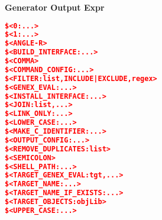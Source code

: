 \documentclass{article}
\begin{document}
\begin{minipage}[t]{0.18\linewidth}
\textbf{Generator Output Expr}
\begin{lstlisting}[language=CMake]
$<0:...>
$<1:...>
$<ANGLE-R>
$<BUILD_INTERFACE:...>
$<COMMA>
$<COMMAND_CONFIG:...>
$<FILTER:list,INCLUDE|EXCLUDE,regex>
$<GENEX_EVAL:...>
$<INSTALL_INTERFACE:...>
$<JOIN:list,...>
$<LINK_ONLY:...>
$<LOWER_CASE:...>
$<MAKE_C_IDENTIFIER:...>
$<OUTPUT_CONFIG:...>
$<REMOVE_DUPLICATES:list>
$<SEMICOLON>
$<SHELL_PATH:...>
$<TARGET_GENEX_EVAL:tgt,...>
$<TARGET_NAME:...>
$<TARGET_NAME_IF_EXISTS:...>
$<TARGET_OBJECTS:objLib>
$<UPPER_CASE:...>
\end{lstlisting}
\end{minipage}

\pagebreak

\end{document}
